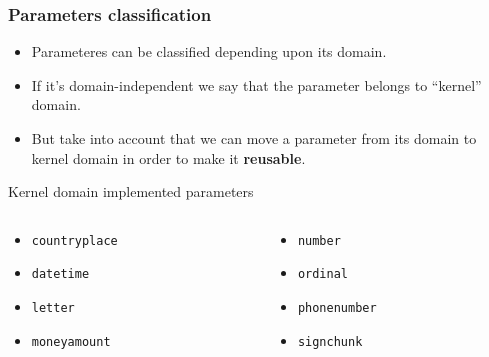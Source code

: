 \documentclass[11pt]{beamer}
\begin{document}
\begin{frame}[fragile]
\frametitle{Parameters classification}
\begin{itemize}
	\item Parameteres can be classified depending upon its domain. 
	\item If it's domain-independent we say that the parameter belongs to ``kernel'' domain.
	\item But take into account that we can move a parameter from its domain to kernel domain in order to make it \textbf{reusable}.
\end{itemize}
	\pause
	\begin{block}{Kernel domain implemented parameters}
	\begin{columns}
		\begin{column}{0.50\textwidth}
			\begin{itemize}
				\item \texttt{countryplace}
				\item \texttt{datetime}
				\item \texttt{letter}
				\item \texttt{moneyamount}
			\end{itemize}
		\end{column}
		\begin{column}{0.50\textwidth}
			\begin{itemize}
				\item \texttt{number}
				\item \texttt{ordinal}
				\item \texttt{phonenumber}
				\item \texttt{signchunk}
			\end{itemize}
		\end{column}
	\end{columns}
	\end{block}
\end{frame}
	
\end{document}
